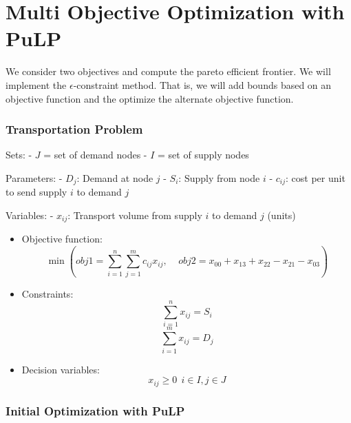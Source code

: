  
    \hypertarget{multi-objective-optimization}{%
\section{Multi Objective
Optimization with PuLP}\label{multi-objective-optimization}}

We consider two objectives and compute the pareto efficient frontier. We
will implement the \(\epsilon\)-constraint method. That is, we will add
bounds based on an objective function and the optimize the alternate
objective function.

\hypertarget{transportation-problem}{%
\subsubsection{Transportation Problem}\label{transportation-problem}}

Sets: - \(J\) = set of demand nodes - \(I\) = set of supply nodes

Parameters: - \(D_j\): Demand at node \(j\) - \(S_i\): Supply from node
\(i\) - \(c_{ij}\): cost per unit to send supply \(i\) to demand \(j\)

Variables: - \(x_{ij}\): Transport volume from supply \(i\) to demand
\(j\) (units)

\begin{itemize}
\tightlist
\item
  Objective function:
  \[\min \left( obj1 = \sum_{i=1}^n\sum_{j=1}^mc_{ij}x_{ij}, \ \ \ \ \    obj2 =  x_{00} + x_{13} + x_{22} - x_{21} - x_{03}\right)\]
\item
  Constraints: \[\sum_{i=1}^nx_{ij}=S_i\] \[\sum_{i=1}^mx_{ij}=D_j\]
\item
  Decision variables: \[x_{ij} \geq 0 \ \ i \in I, j \in J\]
\end{itemize}

    \hypertarget{initial-optimization-with-pulp}{%
\subsubsection{Initial Optimization with
PuLP}\label{initial-optimization-with-pulp}}

